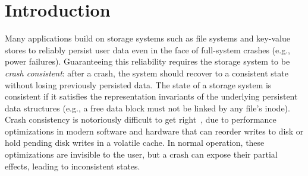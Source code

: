 \section{Introduction}





Many applications build on storage systems
such as file systems and key-value stores
to reliably persist user data
even in the face of full-system crashes (e.g., power failures).
Guaranteeing this reliability requires the storage system to be \emph{crash consistent}:
after a crash, the system should recover to a consistent state without losing previously persisted data.
The state of a storage system is consistent if it satisfies the representation 
invariants of the underlying persistent data structures (e.g., a free data block must not be linked by any file's inode).
Crash consistency is notoriously difficult to get right~\cite{yang:explode,pillai:appcrash,zheng:torturing-db}, 
due to performance optimizations in modern software and hardware
that can reorder writes to disk
or hold pending disk writes in a volatile cache.
In normal operation, these optimizations are invisible to the user,
but a crash can expose their partial effects, leading to 
inconsistent states.

